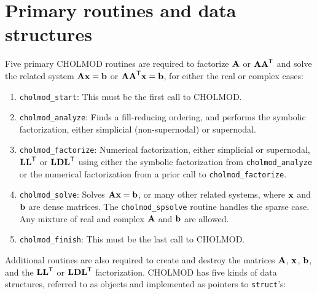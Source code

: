 \documentclass[11pt]{article}
\newcommand{\m}[1]{{\bf{#1}}}       %
\newcommand{\tr}{^{\sf T}}          %
\begin{document}
\newpage \section{Primary routines and data structures}

Five primary CHOLMOD routines are required to factorize $\m{A}$ or $\m{AA}\tr$
and solve the related system $\m{Ax}=\m{b}$ or $\m{AA}\tr\m{x}=\m{b}$,
for either the real or complex cases:
\begin{enumerate}
\item {\tt cholmod\_start}:
    This must be the first call to CHOLMOD.

\item {\tt cholmod\_analyze}:
    Finds a fill-reducing ordering, and performs the symbolic factorization,
    either simplicial (non-supernodal) or supernodal.

\item {\tt cholmod\_factorize}:
    Numerical factorization, either simplicial or supernodal, $\m{LL}\tr$ or $\m{LDL}\tr$
    using either the symbolic factorization from {\tt cholmod\_analyze} or the numerical
    factorization from a prior call to {\tt cholmod\_factorize}.

\item {\tt cholmod\_solve}:
    Solves $\m{Ax}=\m{b}$, or many other related systems, where $\m{x}$ and
    $\m{b}$ are dense matrices.  The {\tt cholmod\_spsolve} routine handles
    the sparse case.  Any mixture of real and complex $\m{A}$ and $\m{b}$ are
    allowed.

\item {\tt cholmod\_finish}:
    This must be the last call to CHOLMOD.
\end{enumerate}

Additional routines are also required to create and destroy
the matrices $\m{A}$, $\m{x}$, $\m{b}$, and the $\m{LL}\tr$ or $\m{LDL}\tr$ factorization.
CHOLMOD has five kinds of data structures, referred to as objects and implemented
as pointers to {\tt struct}'s:
\end{document}
